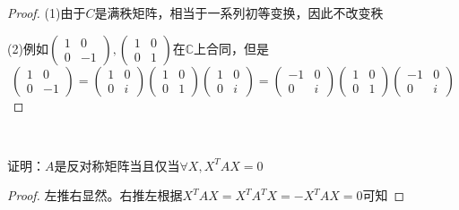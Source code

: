 \begin{proof}
  (1)由于$C$是满秩矩阵，相当于一系列初等变换，因此不改变秩

  (2)例如$\left(
    \begin{array}{cc}
      1&0\\
      0&-1
    \end{array}
  \right), \left(
    \begin{array}{cc}
      1&0\\
      0&1
    \end{array}
  \right)$在$\mathbb{C}$上合同，但是
  \begin{equation*}
    \left(
      \begin{array}{cc}
        1&0\\
        0&-1
      \end{array}
    \right) = \left(
      \begin{array}{cc}
        1&0\\
        0&i
      \end{array}
    \right) \left(
      \begin{array}{cc}
        1&0\\
        0&1
      \end{array}
    \right) \left(
      \begin{array}{cc}
        1&0\\
        0&i
      \end{array}
    \right)
    =
   \left(
    \begin{array}{cc}
      -1&0\\
      0&i
    \end{array}
  \right) \left(
    \begin{array}{cc}
      1&0\\
      0&1
    \end{array}
  \right) \left(
    \begin{array}{cc}
      -1&0\\
      0&i
    \end{array}
  \right)
  \end{equation*}
\end{proof}

~

\begin{exercise}[反对称矩阵的二次型]
  证明：$A$是反对称矩阵当且仅当$\forall X, X^TAX = 0$
\end{exercise}

\begin{proof}
  左推右显然。右推左根据$X^TAX = X^TA^TX = -X^TAX = 0$可知
\end{proof}

